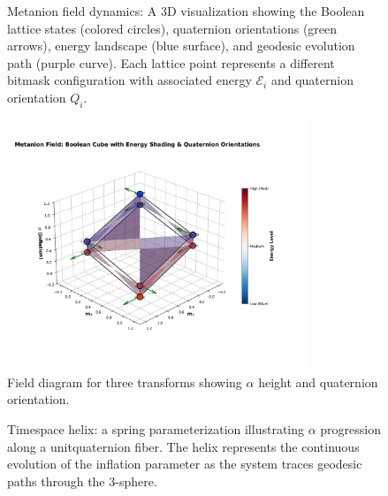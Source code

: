 \documentclass{article}
\begin{document}
\begin{figure}[h]
  \caption{Metanion field dynamics: A 3D visualization showing the Boolean lattice states (colored circles), quaternion orientations (green arrows), energy landscape (blue surface), and geodesic evolution path (purple curve). Each lattice point represents a different bitmask configuration with associated energy $\mathcal{E}_i$ and quaternion orientation $Q_i$.}
  \label{fig:metanion_field}
\end{figure}

\begin{figure}[h]
  \centering
  \includegraphics[width=0.8\textwidth]{metanion_field_diagram.pdf}
  \caption{Field diagram for three transforms showing $\alpha$ height and quaternion orientation.}
  \label{fig:field}
\end{figure}

\begin{figure}[h]
  \centering
  \caption{Timespace helix: a spring parameterization illustrating $\alpha$ progression along a unit\textendash quaternion fiber. The helix represents the continuous evolution of the inflation parameter as the system traces geodesic paths through the 3-sphere.}
  \label{fig:helix}
\end{figure}
\end{document}
